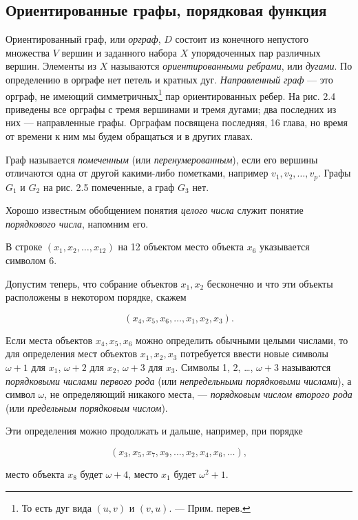 \subsection{Ориентированные графы, порядковая функция}

Ориентированный граф, или \textit{орграф}, $D$ состоит из конечного непустого множества $V$ вершин и заданного набора $X$ упорядоченных пар различных вершин. Элементы из $X$ называются \textit{ориентированными ребрами}, или \textit{дугами}. По определению в орграфе нет петель и кратных дуг. \textit{Направленный граф} --- это орграф, не имеющий симметричных\footnote{То есть дуг вида $(u, v)$ и $(v, u)$. --- Прим. перев.} пар ориентированных ребер. На рис. 2.4 приведены все орграфы с тремя вершинами и тремя дугами; два последних из них --- направленные графы. Орграфам посвящена последняя, 16 глава, но время от времени к ним мы будем обращаться и в других главах.

Граф называется \textit{помеченным} (или \textit{перенумерованным}), если его вершины отличаются одна от другой какими-либо пометками, например $v_1, v_2, \ldots, v_p$. Графы $G_1$ и $G_2$ на рис. 2.5 помеченные, а граф $G_3$ нет.

Хорошо известным обобщением понятия \textit{целого числа} служит понятие \textit{порядкового числа}, напомним его.

В строке $(x_1, x_2, \ldots, x_{12})$ на 12 объектом место объекта $x_6$ указывается символом 6.

Допустим теперь, что собрание объектов $x_1, x_2$ бесконечно и что эти объекты расположены в некотором порядке, скажем

\[
(x_4, x_5, x_6, \ldots, x_1, x_2, x_3).
\]

Если места объектов $x_4, x_5, x_6$ можно определить обычными целыми числами, то для определения мест объектов $x_1, x_2, x_3$ потребуется ввести новые символы $\omega + 1$ для $x_1$, $\omega + 2$ для $x_2$, $\omega + 3$ для $x_3$. Символы 1, 2, \ldots, $\omega + 3$ называются \textit{порядковыми числами первого рода} (или \textit{непредельными порядковыми числами}), а символ $\omega$, не определяющий никакого места, — \textit{порядковым числом второго рода} (или \textit{предельным порядковым числом}).

Эти определения можно продолжать и дальше, например, при порядке

\[
(x_3, x_5, x_7, x_9, \ldots, x_2, x_4, x_6, \ldots),
\]

место объекта $x_8$ будет $\omega + 4$, место $x_1$ будет $\omega^2 + 1$.

